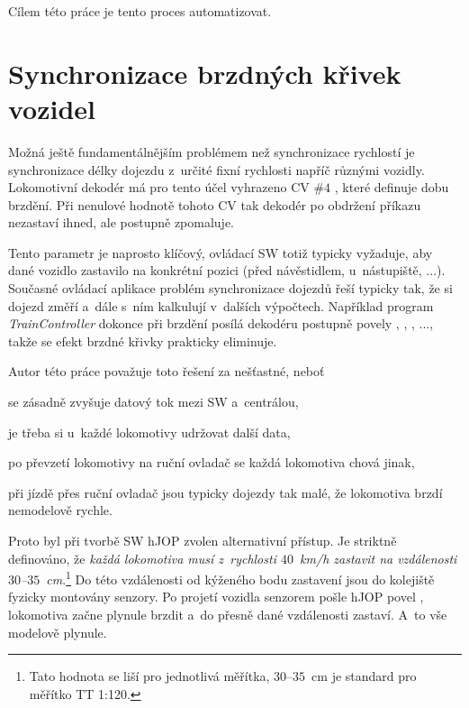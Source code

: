 Cílem této práce je tento proces automatizovat.

\section{Synchronizace brzdných křivek vozidel}
\label{sec:sync-krivky}

Možná ještě fundamentálnějším problémem než synchronizace rychlostí je
synchronizace délky dojezdu z~určité fixní rychlosti napříč různými vozidly.
Lokomotivní dekodér má pro tento účel vyhrazeno \gls{CV} $\#4$ \cite{zimo:cvs},
které definuje dobu brzdění. Při nenulové hodnotě tohoto \gls{CV} tak dekodér
po obdržení příkazu  nezastaví ihned, ale postupně zpomaluje.

Tento parametr je naprosto klíčový, ovládací SW totiž typicky vyžaduje, aby
dané vozidlo zastavilo na konkrétní pozici (před návěstidlem, u~nástupiště,
...).  Současné ovládací aplikace problém synchronizace dojezdů řeší typicky
tak, že si dojezd změří a~dále s~ním kalkulují v~dalších výpočtech. Například
program \textit{TrainController} \cite{traincontroller:web} dokonce při brzdění
posílá dekodéru postupně povely , ,
, ..., takže se efekt brzdné křivky prakticky eliminuje.

Autor této práce považuje toto řešení za nešťastné, neboť
\begin{compactenum}
\item se zásadně zvyšuje datový tok mezi SW a~centrálou,
\item je třeba si u~každé lokomotivy udržovat další data,
\item po převzetí lokomotivy na ruční ovladač se každá lokomotiva chová jinak,
\item při jízdě přes ruční ovladač jsou typicky dojezdy tak malé, že lokomotiva
      brzdí nemodelově rychle.
\end{compactenum}

Proto byl při tvorbě SW hJOP zvolen alternativní přístup. Je striktně
definováno, že \textit{každá lokomotiva musí z~rychlosti $40$~km/h zastavit na
vzdálenosti $30$\mbox{--}$35$~cm}.\footnote{Tato hodnota se liší pro jednotlivá
měřítka, $30$\mbox{--}$35$~cm je standard pro měřítko TT 1:120.} Do této
vzdálenosti od kýženého bodu zastavení jsou do kolejiště fyzicky montovány
senzory. Po projetí vozidla senzorem pošle hJOP povel , lokomotiva začne plynule brzdit a~do přesně dané vzdálenosti
zastaví. A~to vše modelově plynule.

